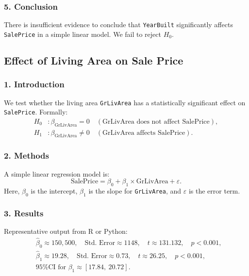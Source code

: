 \documentclass{article}
\begin{document}
\subsubsection*{5. Conclusion}
There is insufficient evidence to conclude that \texttt{YearBuilt} significantly affects \texttt{SalePrice} in a simple linear model. We fail to reject \(H_0\).

\vspace{1em}

\subsection*{Effect of Living Area on Sale Price}

\subsubsection*{1. Introduction}
We test whether the living area \texttt{GrLivArea} has a statistically significant effect on \texttt{SalePrice}. Formally:
\[
\begin{aligned}
H_0 &: \beta_{\text{GrLivArea}} = 0 \quad (\text{GrLivArea does not affect SalePrice}),\\
H_1 &: \beta_{\text{GrLivArea}} \neq 0 \quad (\text{GrLivArea affects SalePrice}).
\end{aligned}
\]

\subsubsection*{2. Methods}
A simple linear regression model is:
\[
\text{SalePrice} = \beta_0 + \beta_1 \times \text{GrLivArea} + \varepsilon.
\]
Here, \(\beta_0\) is the intercept, \(\beta_1\) is the slope for \texttt{GrLivArea}, and \(\varepsilon\) is the error term.

\subsubsection*{3. Results}
Representative output from R or Python:
\[
\begin{aligned}
& \hat{\beta}_0 \approx 150{,}500, 
  \quad \text{Std.~Error} \approx 1148, 
  \quad t \approx 131.132, 
  \quad p < 0.001, \\
& \hat{\beta}_1 \approx 19.28, 
  \quad \text{Std.~Error} \approx 0.73, 
  \quad t \approx 26.25, 
  \quad p < 0.001, \\
& \text{95\% CI for } \beta_1 \approx [17.84,\ 20.72].
\end{aligned}
\]
\end{document}
